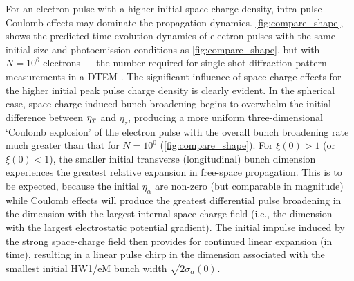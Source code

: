 For an electron pulse with a higher initial space-charge density, intra-pulse Coulomb effects may dominate the propagation dynamics.
\ref{fig:compare_shape}, shows the predicted time evolution dynamics of electron pulses with the same initial size and photoemission conditions as \ref{fig:compare_shape}, but with $ N = 10^{6} $ electrons --- the number required for single-shot diffraction pattern measurements in a DTEM \cite{berger_dc_2009,armstrong_practical_2007}.
The significant influence of space-charge effects for the higher initial peak pulse charge density is clearly evident.
In the spherical case, space-charge induced bunch broadening begins to overwhelm the initial difference between $\eta_{{\scriptscriptstyle T}}$ and $\eta_{z}$, producing a more uniform three-dimensional `Coulomb explosion' of the electron pulse with the overall bunch broadening rate much greater than that for $ N = 10^{0} $ (\ref{fig:compare_shape}).
For $ \xi (0) > 1 $ (or $ \xi (0) < 1 $), the smaller initial transverse (longitudinal) bunch dimension experiences the greatest relative expansion in free-space propagation. This is to be expected, because the initial $\eta_{\alpha}$ are non-zero (but comparable in magnitude) while Coulomb effects will produce the greatest differential pulse broadening in the dimension with the largest internal space-charge field (i.e., the dimension with the largest electrostatic potential gradient).
The initial impulse induced by the strong space-charge field then provides for continued linear expansion (in time), resulting in a linear pulse chirp in the dimension associated with the smallest initial HW1/eM bunch width \cite{michalik_analytic_2006,berger_dc_2009} $ \sqrt{ 2 \sigma_{\alpha} (0) } $.

